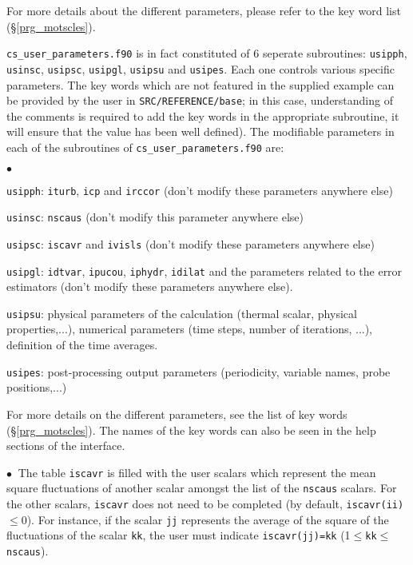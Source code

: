 {{For more details about the different parameters, please refer to the key
word list (\S\ref{prg_motscles}).

\texttt{cs\_user\_parameters.f90} is in fact constituted of 6 seperate subroutines:  \texttt{usipph},
 \texttt{usinsc}, \texttt{usipsc}, \texttt{usipgl},
\texttt{usipsu} and \texttt{usipes}. Each one controls various
 specific parameters. The key words which are not featured in the supplied example
can be provided by the user in \texttt{SRC/REFERENCE/base}; in this case,
understanding of the comments is required to add the key words in the appropriate
subroutine, it will ensure that the value
has been well defined). The modifiable parameters in each of the subroutines of
\texttt{cs\_user\_parameters.f90} are:

\begin{list}{$\bullet$}{}
\item \texttt{usipph}: \texttt{iturb}, \texttt{icp} and \texttt{irccor} (don't modify these
      parameters anywhere else)
\item \texttt{usinsc}: \texttt{nscaus} (don't modify this parameter anywhere
      else)
\item \texttt{usipsc}: \texttt{iscavr} and \texttt{ivisls} (don't modify these
      parameters anywhere else)
\item \texttt{usipgl}: \texttt{idtvar}, \texttt{ipucou}, \texttt{iphydr}, \texttt{idilat} and the
      parameters related to the error estimators (don't modify these parameters
      anywhere else).
\item \texttt{usipsu}: physical parameters of the calculation (thermal scalar, physical
      properties,...), numerical parameters (time steps, number of iterations, ...),
      definition of the time averages.
\item \texttt{usipes}: post-processing output parameters (periodicity, variable names,
      probe positions,...)
\end{list}

For more details on the different parameters, see the list of key words  (\S\ref{prg_motscles}).
 The names of the key words can also be seen in the help sections of the interface.

$\bullet\ $ The table \texttt{iscavr} is filled with the user scalars which represent the mean square fluctuations of another scalar amongst the list of the \texttt{nscaus} scalars. For the other scalars, \texttt{iscavr} does not need to be completed (by default,
\texttt{iscavr(ii)}$\leqslant$0). For instance, if the scalar \texttt{jj}
represents the average of the square of the fluctuations of the scalar \texttt{kk},
the user must indicate \texttt{iscavr(jj)=kk}
(1$\leqslant$\texttt{kk}$\leqslant$\texttt{nscaus}).

}}
